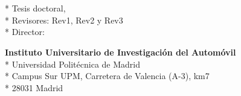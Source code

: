 \cleardoublepage
\begin{fullwidth}
~\vfill
\thispagestyle{empty}
\setlength{\parindent}{0pt}
\setlength{\parskip}{\baselineskip}
\theauthor

\par{
	\textit{\thetitle}\\*
	Tesis doctoral, \thedate\\*
	Revisores: Rev1, Rev2 y Rev3\\*
	Director: \thanklessadvisor
	}

\par{
	\textbf{Instituto Universitario de Investigación del Automóvil}\\*
	Universidad Politécnica de Madrid\\*
	Campus Sur UPM, Carretera de Valencia (A-3), km7\\*
	28031 Madrid
}

\par{
	\doclicenseThis
}

\end{fullwidth}